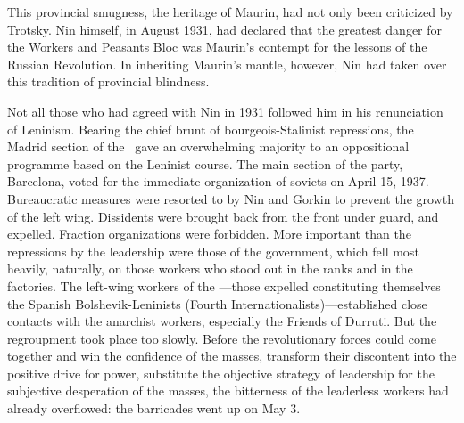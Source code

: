 This provincial smugness, the heritage of Maurin, had not only been criticized by Trotsky. Nin himself, in August 1931, had declared that the greatest danger for the Workers and Peasants Bloc was Maurin’s contempt for the lessons of the Russian Revolution. In inheriting Maurin’s mantle, however, Nin had taken over this tradition of provincial blindness.

Not all those who had agreed with Nin in 1931 followed him in his renunciation of Leninism. Bearing the chief brunt of bourgeois-Stalinist repressions, the Madrid section of the \POUM\ gave an overwhelming majority to an oppositional programme based on the Leninist course. The main section of the party, Barcelona, voted for the immediate organization of soviets on April 15, 1937. Bureaucratic measures were resorted to by Nin and Gorkin to prevent the growth of the left wing. Dissidents were brought back from the front under guard, and expelled. Fraction organizations were forbidden. More important than the repressions by the leadership were those of the government, which fell most heavily, naturally, on those workers who stood out in the ranks and in the factories. The left-wing workers of the \POUM---those expelled constituting themselves the Spanish Bolshevik-Leninists (Fourth Internationalists)---established close contacts with the anarchist workers, especially the Friends of Durruti. But the regroupment took place too slowly. Before the revolutionary forces could come together and win the confidence of the masses, transform their discontent into the positive drive for power, substitute the objective strategy of leadership for the subjective desperation of the masses, the bitterness of the leaderless workers had already overflowed: the barricades went up on May 3.